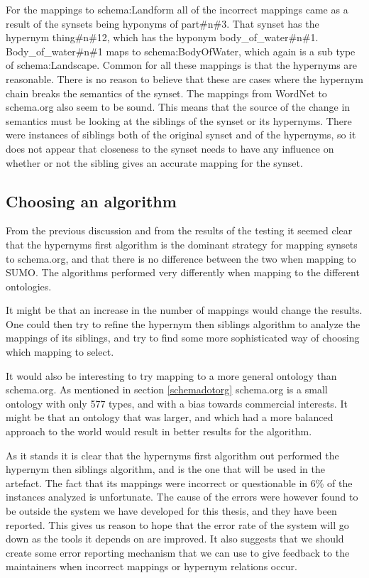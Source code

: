 For the mappings to schema:Landform all of the incorrect mappings came as a result of the synsets being hyponyms of part\#n\#3.
That synset has the hypernym thing\#n\#12, which has the hyponym body\_of\_water\#n\#1.
Body\_of\_water\#n\#1 maps to schema:BodyOfWater, which again is a sub type of schema:Landscape.
Common for all these mappings is that the hypernyms are reasonable.
There is no reason to believe that these are cases where the hypernym chain breaks the semantics of the synset.
The mappings from WordNet to schema.org also seem to be sound.
This means that the source of the change in semantics must be looking at the siblings of the synset or its hypernyms.
There were instances of siblings both of the original synset and of the hypernyms,
so it does not appear that closeness to the synset needs to have any influence on whether or not the sibling gives
an accurate mapping for the synset.

\subsection{Choosing an algorithm}
From the previous discussion and from the results of the testing it seemed clear that the hypernyms first algorithm is
the dominant strategy for mapping synsets to schema.org, and that there is no difference between the two when mapping to SUMO.
The algorithms performed very differently when mapping to the different ontologies.

It might be that an increase in the number of mappings would change the results.
One could then try to refine the hypernym then siblings algorithm to analyze the mappings of its siblings,
and try to find some more sophisticated way of choosing which mapping to select.

It would also be interesting to try mapping to a more general ontology than schema.org.
As mentioned in section \ref{schemadotorg} schema.org is a small ontology with only 577 types,
and with a bias towards commercial interests.
It might be that an ontology that was larger,
and which had a more balanced approach to the world would result in better results for the algorithm.

As it stands it is clear that the hypernyms first algorithm out performed the hypernym then siblings algorithm,
and is the one that will be used in the artefact.
The fact that its mappings were incorrect or questionable in 6\% of the instances analyzed is unfortunate.
The cause of the errors were however found to be outside the system we have developed for this thesis,
and they have been reported.
This gives us reason to hope that the error rate of the system will go down as the tools it depends on are improved.
It also suggests that we should create some error reporting mechanism that we can use to give feedback to the maintainers
when incorrect mappings or hypernym relations occur.

